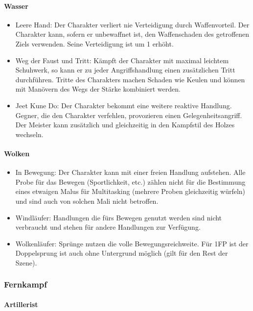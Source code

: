 \documentclass{article}
\begin{document}
\paragraph{Wasser}

\begin{itemize}
\item Leere Hand: Der Charakter verliert nie Verteidigung durch Waffenvorteil. Der Charakter kann, sofern er unbewaffnet ist, den Waffenschaden des getroffenen Ziels verwenden. Seine Verteidigung ist um 1 erhöht.
\item Weg der Faust und Tritt: Kämpft der Charakter mit maximal leichtem Schuhwerk, so kann er zu jeder Angriffshandlung einen zusätzlichen Tritt durchführen. Tritte des Charakters machen Schaden wie Keulen und können mit Manövern des Wegs der Stärke kombiniert werden.
\item Jeet Kune Do: Der Charakter bekommt eine weitere reaktive Handlung. Gegner, die den Charakter verfehlen, provozieren einen Gelegenheitsangriff. Der Meister kann zusätzlich und gleichzeitig in den Kampfstil des Holzes wechseln.
\end{itemize}

\paragraph{Wolken}

\begin{itemize}
\item In Bewegung: Der Charakter kann mit einer freien Handlung aufstehen. Alle Probe für das Bewegen (Sportlichkeit, etc.) zählen nicht für die Bestimmung eines etwaigen Malus für Multitasking (mehrere Proben gleichzeitig würfeln) und sind auch von solchen Mali nicht betroffen.
\item Windläufer: Handlungen die fürs Bewegen genutzt werden sind nicht verbraucht und stehen für andere Handlungen zur Verfügung.
\item Wolkenläufer: Sprünge nutzen die volle Bewegungsreichweite. Für 1FP ist der Doppelsprung ist auch ohne Untergrund möglich (gilt für den Rest der Szene). 
\end{itemize}

\subsubsection{Fernkampf}

\paragraph{Artillerist}
\end{document}

